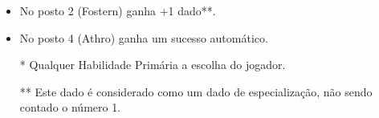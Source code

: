 \begin{itemize}[noitemsep]
    \item No posto 2 (Fostern) ganha +1 dado**.
    
    \item No posto 4 (Athro) ganha um sucesso automático.
    
    \item [*] Qualquer Habilidade Primária a escolha do jogador.
    
    \item [**] Este dado é considerado como um dado de especialização, não sendo contado o número 1.
\end{itemize}

